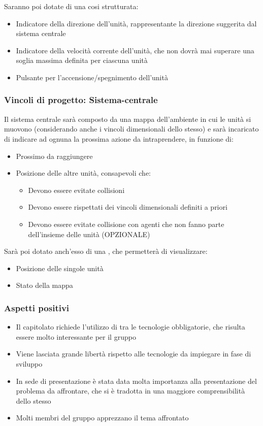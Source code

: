 \documentclass[]{article}
\begin{document}
			Saranno poi dotate di una  cosi strutturata:
			\begin{itemize}
				\item Indicatore della direzione dell'unità, rappresentante la direzione suggerita dal sistema centrale
				\item Indicatore della velocità corrente dell'unità, che non dovrà mai superare una soglia massima definita per ciascuna unità 
				\item Pulsante per l'accensione/spegnimento dell'unità
			\end{itemize}
			
			\subsubsection{Vincoli di progetto: Sistema-centrale}
			Il sistema centrale sarà composto da una mappa dell'ambiente in cui le unità si muovono (considerando anche i vincoli dimensionali dello stesso) e sarà incaricato di indicare ad ognuna la prossima azione da intraprendere, in funzione di:
			\begin{itemize}
				\item Prossimo  da raggiungere
				\item Posizione delle altre unità, consapevoli che:
					\begin{itemize}
						\item Devono essere evitate collisioni
						\item Devono essere rispettati dei vincoli dimensionali definiti a priori
						\item Devono essere evitate collisione con agenti che non fanno parte dell'insieme delle unità (OPZIONALE)
					\end{itemize}
			\end{itemize}
			
			Sarà poi dotato anch'esso di una , che permetterà di visualizzare:
			\begin{itemize}
				\item Posizione  delle singole unità
				\item Stato  della mappa
			\end{itemize}

			\subsubsection{Aspetti positivi}
			\begin{itemize}
				\item Il capitolato richiede l'utilizzo di  tra le tecnologie obbligatorie, che risulta essere molto interessante per il gruppo
				\item Viene lasciata grande libertà rispetto alle tecnologie da impiegare in fase di sviluppo
				\item In sede di presentazione è stata data molta importanza alla presentazione del problema da affrontare, che si è tradotta in una maggiore comprensibilità dello stesso
				\item Molti membri del gruppo apprezzano il tema affrontato
			\end{itemize}
\end{document}
